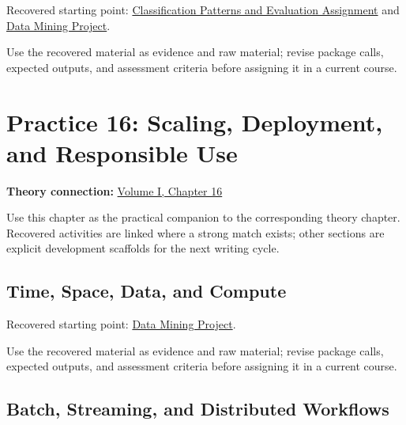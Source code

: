 \documentclass[
  letterpaper,
]{scrbook}
\begin{document}

Recovered starting point:
\hyperref[sec-lab-classification-patterns-assignment]{Classification
Patterns and Evaluation Assignment} and
\hyperref[sec-lab-data-mining-project]{Data Mining Project}.

Use the recovered material as evidence and raw material; revise package
calls, expected outputs, and assessment criteria before assigning it in
a current course.

\chapter*{Practice 16: Scaling, Deployment, and Responsible
Use}\label{ch-practice-16}


\textbf{Theory connection:} \hyperref[ch-scaling]{Volume I, Chapter 16}

Use this chapter as the practical companion to the corresponding theory
chapter. Recovered activities are linked where a strong match exists;
other sections are explicit development scaffolds for the next writing
cycle.

\section*{Time, Space, Data, and
Compute}\label{sec-pr-16-time-space-data-and-compute}


Recovered starting point: \hyperref[sec-lab-data-mining-project]{Data
Mining Project}.

Use the recovered material as evidence and raw material; revise package
calls, expected outputs, and assessment criteria before assigning it in
a current course.

\section*{Batch, Streaming, and Distributed
Workflows}\label{sec-pr-16-batch-streaming-and-distributed-workflows}
\end{document}
